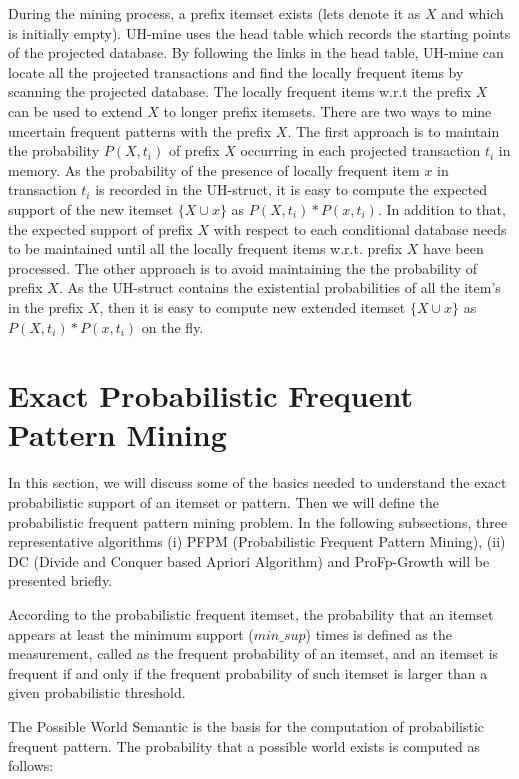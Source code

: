 During the mining process, a prefix itemset exists (lets denote it as $X$ and which is initially empty). UH-mine uses the head table which records the starting points of the projected database. By following the links in the head table, UH-mine can locate all the projected transactions and find the locally frequent items by scanning the projected database. The locally frequent items w.r.t the prefix $X$ can be used to extend $X$ to longer prefix itemsets. There are two ways to mine uncertain frequent patterns with the prefix $X$. The first approach is to maintain the probability $P(X, t_i)$ of prefix $X$ occurring in each projected transaction $t_i$ in memory. As the probability of the presence of locally frequent item $x$ in transaction $t_i$ is recorded in the UH-struct, it is easy to compute the expected support of the new itemset $\{X \cup x\}$ as $P(X, t_i) * P(x, t_i)$. In addition to that, the expected support of prefix $X$ with respect to each conditional database needs to be maintained until all the locally frequent items w.r.t. prefix $X$ have been processed. The other approach is to avoid maintaining the the probability of prefix $X$. As the UH-struct contains the existential probabilities of all the item's in the prefix $X$, then it is easy to compute new extended itemset $\{X \cup x\}$ as $P(X, t_i) * P(x, t_i)$ on the fly.








\section{Exact Probabilistic Frequent Pattern Mining}
In this section, we will discuss some of the basics needed to understand the exact probabilistic support of an itemset or pattern. Then we will define the probabilistic frequent pattern mining problem. In the following subsections, three representative algorithms (i) PFPM (Probabilistic Frequent Pattern Mining), (ii) DC (Divide and Conquer based Apriori Algorithm) and ProFp-Growth will be presented briefly.

 According to the probabilistic frequent itemset, the probability that an itemset appears at least the minimum support ($min\_sup$) times is defined as the measurement, called as the frequent probability of an itemset, and an itemset is frequent if and only if the frequent probability of such itemset is larger than a given probabilistic threshold.

The Possible World Semantic is the basis for the computation of probabilistic frequent pattern. The probability that a  possible world exists is computed as follows:

